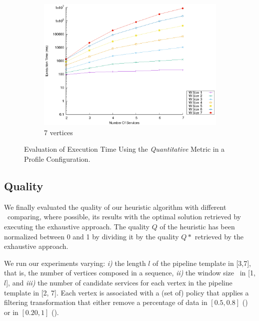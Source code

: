 \begin{figure}[!htb]
\begin{subfigure}{0.33\textwidth}
    \includegraphics[width=\textwidth]{Images/graphs/window_time_performance_n7_s7_20_100_n7}
    \caption{7 vertices}
    \label{fig:time_window_perce_average_7n}
  \end{subfigure}
  \caption{Evaluation of Execution Time Using the \emph{Quantitative} Metric in a \average Profile Configuration.}
  \label{fig:time_window_perce_average}
\end{figure}
\subsection{Quality}\label{subsec:experiments_quality}
We finally evaluated the quality of our heuristic algorithm with different \windowsize\ comparing, where possible, its results with the optimal solution retrieved by executing the exhaustive approach. %
The quality $Q$ of the heuristic has been normalized between 0 and 1 by dividing it by the quality $Q*$ retrieved by the exhaustive approach.


We run our experiments varying: \emph{i)} the length $l$ of the pipeline template in [3,7], that is, the number of vertices composed in a sequence, \emph{ii)} the window size \windowsize\ in [1,$l$], and \emph{iii)} the number of candidate services for each vertex in the pipeline template in [2, 7]. Each vertex is associated with a (set of) policy that applies a filtering transformation that either remove a percentage of data in $[0.5,0.8]$ (\average) or in $[0.20,1]$ (\wide).

